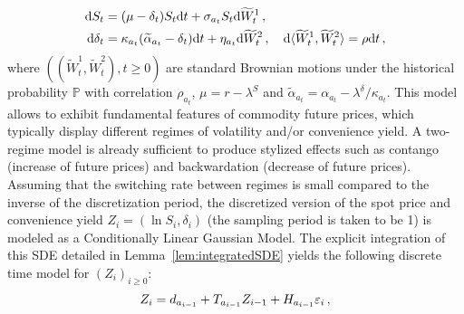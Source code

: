 \begin{align*}
\mathrm{d} S_{t} & = (\mu -\delta_{t})S_{t}\mathrm{d} t+\sigma_{a_t} S_{t} \mathrm{d} \widetilde{W}_{t}^{1} \,,\\
\mathrm{d} \delta_{t} & = \kappa_{a_t}(\widetilde{\alpha}_{a_t}-\delta_{t})\mathrm{d} t+\eta_{a_t} \mathrm{d} \widetilde{W}_{t}^{2} \,, \quad \mathrm{d} \langle \widetilde{W}_t^1, \widetilde{W}_t^2\rangle = \rho \mathrm{d} t\,,
\end{align*}
where $( (\widetilde{W}_t^1,\widetilde{W}_t^2), t \geq 0)$ are standard Brownian motions under the historical probability $\mathbb{P}$ with  correlation $\rho_{a_t}$, $\mu = r - \lambda^S$ and $\widetilde{\alpha}_{a_t} = \alpha_{a_t} - \lambda^{\delta}/\kappa_{a_t} $. This model allows to exhibit fundamental features of commodity future prices, which typically display different regimes of volatility and/or convenience yield. A two-regime model is already sufficient to produce stylized effects such as contango (increase of future prices) and backwardation (decrease of future prices).  Assuming that the switching rate between regimes is small compared to the inverse of the discretization period, the discretized version of the spot price and convenience yield $Z_i= (\ln S_i, \delta_i)$ (the sampling period is taken to be 1) is modeled as a Conditionally Linear Gaussian Model. The explicit integration of this SDE detailed in Lemma~\ref{lem:integratedSDE} yields the following discrete time model for $(Z_i)_{i\ge 0}$:
\[
Z_i = d_{a_{i-1}} + T_{a_{i-1}} Z_{i-1} + H_{a_{i-1}} \varepsilon_i\,,
\]
